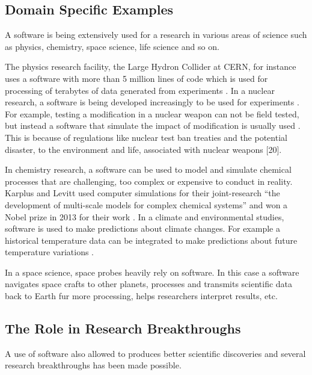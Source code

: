 \subsection{Domain Specific Examples}
A software is being extensively used for a research in various areas of science such as physics, chemistry, space science, life science and so on.

The physics research facility, the Large Hydron Collider at CERN, for instance uses a software with more than 5 million lines of code which is used for processing of terabytes of data generated from experiments \cite{storer2017bridging}.
In a nuclear research, a software is being developed increasingly to be used for experiments \cite{yan2017case}. For example, testing a modification in a nuclear weapon can not be field tested, but instead a software that simulate the impact of modification is usually used \cite{kanewala2014testing}. This is because of regulations like nuclear test ban treaties and the potential disaster, to the environment and life, associated with nuclear weapons [20]. 

In chemistry research, a software can be used to model and simulate chemical processes that are challenging, too complex or expensive to conduct in reality. Karplus and Levitt used computer simulations for their joint-research “the development of multi-scale models for complex chemical systems”  and won a Nobel prize in 2013 for their work \cite{storer2017bridging}\cite{andre2014nobel}. 
In a climate and environmental studies, software is used to make predictions about climate changes. For example a historical temperature data can be integrated to make predictions about future temperature variations \cite{storer2017bridging}.

In a space science, space probes heavily rely on software. In this case a software navigates space crafts to other planets, processes and transmits scientific data back to Earth fur more processing, helps researchers interpret results, etc\cite{lutz2011software}.


\subsection{The Role in Research Breakthroughs  }
A use of software also allowed to produces better scientific discoveries and several research breakthroughs has been made possible\cite{goble2014better}. 


